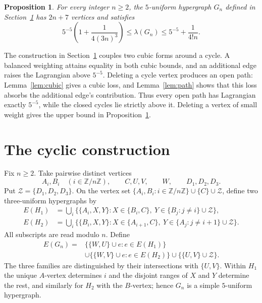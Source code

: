 \documentclass[11pt]{article}
\newtheorem{proposition}[theorem]{Proposition}
\numberwithin{equation}{section}
\newcommand{\Z}{\mathcal Z}
\begin{document}
\begin{proposition}\label{prop:sequence}
For every integer \(n\ge2\), the \(5\)-uniform hypergraph \(G_n\)
defined in Section~\ref{sec:construction} has \(2n+7\) vertices and
satisfies
\begin{equation}\label{eq:bounds}
 5^{-5}\left(1+\frac1{4(3n)^{3}}\right)
 \le\lambda(G_n)\le5^{-5}+\frac1{4!n}.
\end{equation}
\end{proposition}

The construction in Section~\ref{sec:construction} couples two cubic forms
around a cycle. A balanced weighting attains equality in both cubic bounds,
and an additional edge raises the Lagrangian above \(5^{-5}\).
Deleting a cycle vertex produces an open path: Lemma~\ref{lem:cubic}
gives a cubic loss, and Lemma~\ref{lem:path} shows that this loss absorbs
the additional edge's contribution. Thus every open path has Lagrangian
exactly \(5^{-5}\), while the closed cycles lie strictly above it.
Deleting a vertex of small weight gives the upper bound in
Proposition~\ref{prop:sequence}.

\section{The cyclic construction}\label{sec:construction}

Fix \(n\ge2\). Take pairwise distinct vertices
\[
 A_i,B_i\quad(i\in\mathbb Z/n\mathbb Z),\qquad C,U,V,
 \qquad W,\qquad D_1,D_2,D_3.
\]
Put \(\Z=\{D_1,D_2,D_3\}\).
On the vertex set \(\{A_i,B_i:i\in\mathbb Z/n\mathbb Z\}\cup
\{C\}\cup\Z\), define two three-uniform hypergraphs by
\begin{align*}
 E(H_1)&=\bigcup_i
 \bigl\{\{A_i,X,Y\}:X\in\{B_i,C\},\
 Y\in\{B_j:j\ne i\}\cup\Z\bigr\},\\
 E(H_2)&=\bigcup_i
 \bigl\{\{B_i,X,Y\}:X\in\{A_{i+1},C\},\
 Y\in\{A_j:j\ne i+1\}\cup\Z\bigr\}.
\end{align*}
All subscripts are read modulo \(n\). Define
\begin{equation}\label{eq:edges}
 \begin{split}
 E(G_n)={}&\bigl\{\{W,U\}\cup e:e\in E(H_1)\bigr\}\\
 &\cup\bigl\{\{W,V\}\cup e:e\in E(H_2)\bigr\}
 \cup\bigl\{\{U,V\}\cup\Z\bigr\}.
 \end{split}
\end{equation}
The three families are distinguished by their intersections with \(\{U,V\}\).
Within \(H_1\) the unique \(A\)-vertex determines \(i\) and the disjoint
ranges of \(X\) and \(Y\) determine the rest, and similarly for \(H_2\)
with the \(B\)-vertex; hence \(G_n\) is a simple \(5\)-uniform hypergraph.
\end{document}
